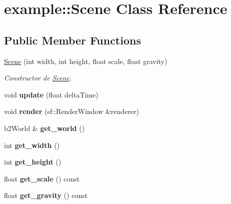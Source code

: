 \hypertarget{classexample_1_1_scene}{}\section{example\+::Scene Class Reference}
\label{classexample_1_1_scene}
\subsection*{Public Member Functions}
\begin{DoxyCompactItemize}
\item 
\mbox{\hyperlink{classexample_1_1_scene_a1fe6da262ba4c25503c19eb5e8637190}{Scene}} (int width, int height, float scale, float gravity)
\begin{DoxyCompactList}\small\item\em Constructor de \mbox{\hyperlink{classexample_1_1_scene}{Scene}}. \end{DoxyCompactList}\item 
\mbox{\label{classexample_1_1_scene_a0e90063ee88a217dac88ab964a7dab74}} 
void {\bfseries update} (float delta\+Time)
\item 
\mbox{\label{classexample_1_1_scene_a1f78f6222b05a7811d77d4840f3346fc}} 
void {\bfseries render} (sf\+::\+Render\+Window \&renderer)
\item 
\mbox{\label{classexample_1_1_scene_a8bf30ba2aaed0eee5538dc51df64c6e1}} 
b2\+World \& {\bfseries get\+\_\+world} ()
\item 
\mbox{\label{classexample_1_1_scene_ac29a51e28d223428f95a23b48bc02710}} 
int {\bfseries get\+\_\+width} ()
\item 
\mbox{\label{classexample_1_1_scene_a3ff2b375c40031835ed6f94910f74094}} 
int {\bfseries get\+\_\+height} ()
\item 
\mbox{\label{classexample_1_1_scene_a700d51c305e0762472c69e3ae8fcc97f}} 
float {\bfseries get\+\_\+scale} () const
\item 
\mbox{\label{classexample_1_1_scene_a39dd7f357b227855409fd54fc73025ce}} 
float {\bfseries get\+\_\+gravity} () const

\end{DoxyCompactItemize}
